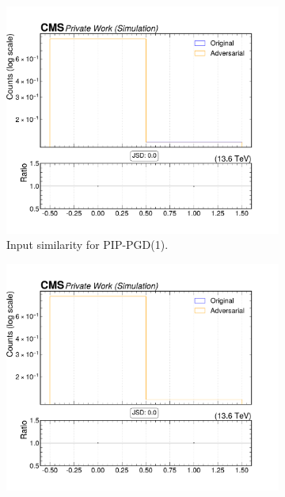 \begin{figure}[htbp]
  \centering
  \begin{subfigure}[t]{0.32\textwidth}
    \includegraphics[width=\linewidth]{media/output/features/compare/combined_it_1/cmp_npf_arr_Npfcan_isGamma.pdf}
    \caption*{Input similarity for PIP-PGD(1).}
  \end{subfigure}\hfill
  \begin{subfigure}[t]{0.32\textwidth}
    \includegraphics[width=\linewidth]{media/output/features/compare/combined_it_2/cmp_npf_arr_Npfcan_isGamma.pdf}

\end{subfigure}
\end{figure}
